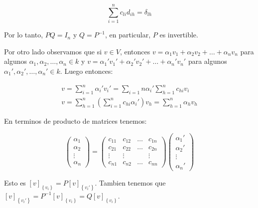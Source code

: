 \documentclass[12pt]{article}
\begin{document}
\begin{equation}
	\sum\limits_{i=1}^{n} c_{li} d_{ih} = \delta_{lh}
\end{equation}

Por lo tanto, $P Q = I_n$ y $Q = P^{-1}$, en particular, $P$ es invertible.

Por otro lado observamos que si $v \in V$, entonces $v = \alpha_1 v_1 +\alpha_2 v_2 + \dots + \alpha_n v_n$ para algunos $\alpha_1, \alpha_2, \dots, \alpha_n \in k$ y $v = \alpha_1' v_1' +\alpha_2' v_2' + \dots + \alpha_n' v_n'$ para algunos $\alpha_1', \alpha_2', \dots, \alpha_n' \in k$. Luego entonces:

\begin{eqnarray}
	v = \sum\limits_{i=1}^{n} \alpha_i' v_i' = \sum\limits_{i=1}{n} \alpha_i' \sum\limits_{h=1}^{n} c_{hi} v_i \nonumber \\
	v = \sum\limits_{h=1}^{n} \left( \sum\limits_{i=1}^{n} c_{hi} \alpha_i' \right) v_h = \sum\limits_{h=1}^{n} \alpha_h v_h \nonumber
\end{eqnarray}

En terminos de producto de matrices tenemos:

\begin{equation}
	\begin{pmatrix}
		\alpha_1 \\
		\alpha_2 \\
		\vdots   \\
		\alpha_n
	\end{pmatrix} =
	\begin{pmatrix}
		c_{11} & c_{12} & \dots & c_{1n} \\
		c_{21} & c_{22} & \dots & c_{2n} \\
		\vdots & \vdots &   & \vdots \\
		c_{n1} & c_{n2} & \dots & c_{nn}
	\end{pmatrix}
	\begin{pmatrix}
		\alpha_1' \\
		\alpha_2' \\
		\vdots \\
		\alpha_n'
	\end{pmatrix}
\end{equation}

Esto es $\left[ v \right]_{\left\{ v_i \right\}} = P \left[ v \right]_{\left\{ v_i' \right\}}$. Tambien tenemos que $\left[ v \right]_{\left\{ v_i' \right\}} = P^{-1} \left[ v \right]_{\left\{ v_i \right\}} = Q \left[ v \right]_{\left\{ v_i \right\}}$.
\end{document}
